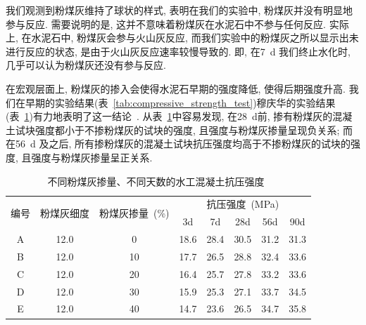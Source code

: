 我们观测到粉煤灰维持了球状的样式, 表明在我们的实验中, 粉煤灰并没有明显地参与反应. 需要说明的是, 这并不意味着粉煤灰在水泥石中不参与任何反应. 实际上, 在水泥石中, 粉煤灰会参与火山灰反应, 而我们实验中的粉煤灰之所以显示出未进行反应的状态, 是由于火山灰反应速率较慢导致的. 即, 在\SI{7}{\day} 我们终止水化时, 几乎可以认为粉煤灰还没有参与反应. 

在宏观层面上, 粉煤灰的掺入会使得水泥石早期的强度降低, 使得后期强度升高. 我们在早期的实验结果(表~\ref{tab:compressive_strength_test})穆庆华的实验结果(表~\ref{tab:strength_fa})有力地表明了这一结论~\cite{mu_fa}. 从表~\ref{tab:strength_fa}中容易发现, 在\SI{28}{\day}前, 掺有粉煤灰的混凝土试块强度都小于不掺粉煤灰的试块的强度, 且强度与粉煤灰掺量呈现负关系; 而在\SI{56}{\day} 及之后, 所有掺粉煤灰的混凝土试块抗压强度均高于不掺粉煤灰的试块的强度, 且强度与粉煤灰掺量呈正关系. 

\begin{table}[!t]
  \centering
  \caption{不同粉煤灰掺量、不同天数的水工混凝土抗压强度~\cite{mu_fa}}
  \begin{tabular}{|c|c|c|ccccc|}
    \hline
    \multirow{2}{*}{编号} & \multirow{2}{*}{粉煤灰细度} & \multirow{2}{*}{粉煤灰掺量~(\unit{\percent})} & \multicolumn{5}{c|}{抗压强度~(\unit{\mega\pascal})}                                                                                            \\ \cline{4-8} 
                        &                        &                        & \multicolumn{1}{c|}{3d}   & \multicolumn{1}{c|}{7d}   & \multicolumn{1}{c|}{28d}  & \multicolumn{1}{c|}{56d}  & 90d  \\ \hline
    A                   & 12.0                   & 0                      & \multicolumn{1}{c|}{18.6} & \multicolumn{1}{c|}{28.4} & \multicolumn{1}{c|}{30.5} & \multicolumn{1}{c|}{31.2} & 31.3 \\ \hline
    B                   & 12.0                   & 10                     & \multicolumn{1}{c|}{17.7} & \multicolumn{1}{c|}{26.5} & \multicolumn{1}{c|}{28.8} & \multicolumn{1}{c|}{32.4} & 33.6 \\ \hline
    C                   & 12.0                   & 20                     & \multicolumn{1}{c|}{16.4} & \multicolumn{1}{c|}{25.7} & \multicolumn{1}{c|}{27.8} & \multicolumn{1}{c|}{33.2} & 33.6 \\ \hline
    D                   & 12.0                   & 30                     & \multicolumn{1}{c|}{15.9} & \multicolumn{1}{c|}{25.3} & \multicolumn{1}{c|}{27.1} & \multicolumn{1}{c|}{33.7} & 34.5 \\ \hline
    E                   & 12.0                   & 40                     & \multicolumn{1}{c|}{14.7} & \multicolumn{1}{c|}{23.6} & \multicolumn{1}{c|}{26.5} & \multicolumn{1}{c|}{34.7} & 35.8 \\ \hline
    \end{tabular}


  \label{tab:strength_fa}
\end{table}


